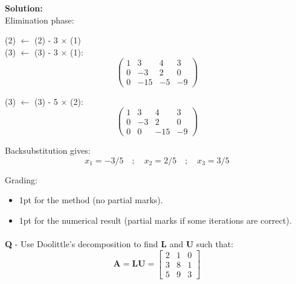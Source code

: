 \documentclass{llncs}
\newcounter{ques}
\renewcommand{\question}[1]{\paragraph{}\textbf{Q\theques} - #1\stepcounter{ques} }
\newcommand{\answer}[1]{\color{red}\textbf{Solution:}\\#1\color{black}}
\begin{document}
\answer{
Elimination phase:

\noindent (2) $\leftarrow$ (2) - 3 $\times$ (1)\\
(3) $\leftarrow$ (3) - 3 $\times$ (1):\\
$$
\left(
\begin{array}{ccc|c}
1 & 3   & 4  & 3 \\
0 & -3  & 2  & 0 \\
0 & -15 & -5 & -9 
\end{array}
\right)
$$

\noindent (3) $\leftarrow$ (3) - 5 $\times$ (2):
$$
\left(
\begin{array}{ccc|c}
1 & 3   & 4  & 3 \\
0 & -3  & 2  & 0 \\
0 & 0 & -15 & -9 
\end{array}
\right)
$$

Backsubstitution gives:
$$
x_1 = -3/5 \quad ; \quad x_2 = 2/5 \quad ; \quad x_3 = 3/5
$$

Grading:
\begin{itemize}
\item 1pt for the method (no partial marks).
\item 1pt for the numerical result (partial marks if some iterations are correct).
\end{itemize}
}

\newpage
\question{Use Doolittle's decomposition to find $\textbf{L}$ and $\textbf{U}$ such that:
$$
\textbf{A}=\textbf{LU}= 
\begin{bmatrix}
2 & 1 & 0 \\
3 & 8 & 1 \\
5 & 9 & 3
\end{bmatrix}
$$
}
\end{document}
